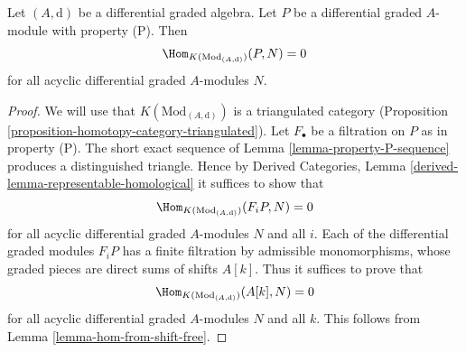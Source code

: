 \begin{lemma}
\label{lemma-property-P-K-projective}
Let $(A, \text{d})$ be a differential graded algebra.
Let $P$ be a differential graded $A$-module with property (P).
Then
$$
\Hom_{K(\text{Mod}_{(A, \text{d})})}(P, N) = 0
$$
for all acyclic differential graded $A$-modules $N$.
\end{lemma}

\begin{proof}
We will use that $K(\text{Mod}_{(A, \text{d})})$ is a triangulated
category (Proposition \ref{proposition-homotopy-category-triangulated}).
Let $F_\bullet$ be a filtration on $P$ as in property (P).
The short exact sequence of Lemma \ref{lemma-property-P-sequence}
produces a distinguished triangle. Hence by
Derived Categories, Lemma \ref{derived-lemma-representable-homological}
it suffices to show that
$$
\Hom_{K(\text{Mod}_{(A, \text{d})})}(F_iP, N) = 0
$$
for all acyclic differential graded $A$-modules $N$ and all $i$.
Each of the differential graded modules $F_iP$ has a finite filtration
by admissible monomorphisms, whose graded pieces are direct sums
of shifts $A[k]$. Thus it suffices to prove that
$$
\Hom_{K(\text{Mod}_{(A, \text{d})})}(A[k], N) = 0
$$
for all acyclic differential graded $A$-modules $N$ and all $k$.
This follows from Lemma \ref{lemma-hom-from-shift-free}.
\end{proof}
